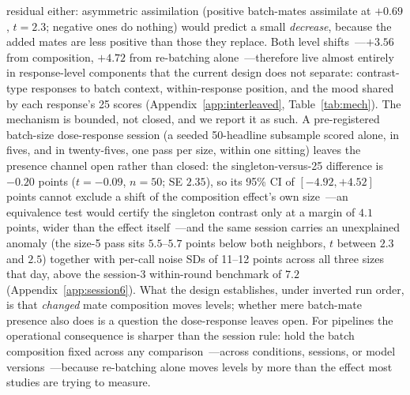 residual either: asymmetric assimilation (positive batch-mates assimilate at $+0.69$, $t=2.3$; negative ones do nothing) would predict a small \emph{decrease}, because the added mates are less positive than those they replace. Both level shifts~---$+3.56$ from composition, $+4.72$ from re-batching alone~---therefore live almost entirely in response-level components that the current design does not separate: contrast-type responses to batch context, within-response position, and the mood shared by each response's 25 scores (Appendix~\ref{app:interleaved}, Table~\ref{tab:mech}). The mechanism is bounded, not closed, and we report it as such. A pre-registered batch-size dose-response session (a seeded 50-headline subsample scored alone, in fives, and in twenty-fives, one pass per size, within one sitting) leaves the presence channel open rather than closed: the singleton-versus-25 difference is $-0.20$ points ($t=-0.09$, $n=50$; SE $2.35$), so its 95\% CI of $[-4.92, +4.52]$ points cannot exclude a shift of the composition effect's own size~---an equivalence test would certify the singleton contrast only at a margin of $4.1$ points, wider than the effect itself~---and the same session carries an unexplained anomaly (the size-5 pass sits $5.5$--$5.7$ points below both neighbors, $t$ between $2.3$ and $2.5$) together with per-call noise SDs of 11--12 points across all three sizes that day, above the session-3 within-round benchmark of $7.2$ (Appendix~\ref{app:session6}). What the design establishes, under inverted run order, is that \emph{changed} mate composition moves levels; whether mere batch-mate presence also does is a question the dose-response leaves open. For pipelines the operational consequence is sharper than the session rule: hold the batch composition fixed across any comparison~---across conditions, sessions, or model versions~---because re-batching alone moves levels by more than the effect most studies are trying to measure.

